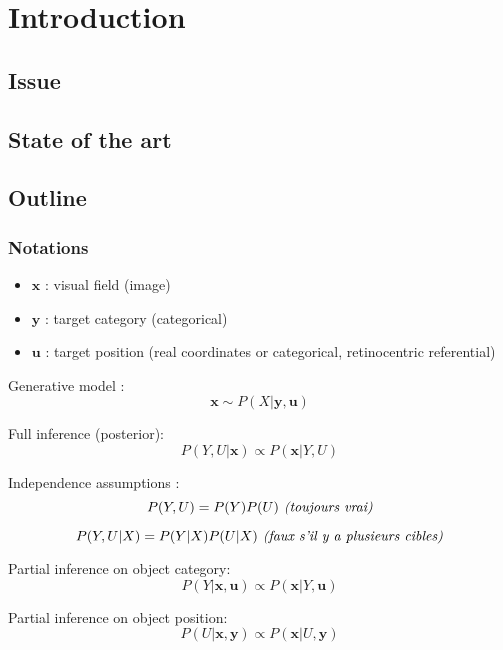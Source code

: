 \section{Introduction}

\subsection{Issue}

\subsection{State of the art}

\subsection{Outline}

\subsubsection{Notations}
\begin{itemize}
	\item $\boldsymbol{x}$ : visual field (image)
	\item $\boldsymbol{y}$ : target category (categorical)
	\item $\boldsymbol{u}$ : target position (real coordinates or categorical, retinocentric referential)

\end{itemize}

Generative model :
$$ \boldsymbol{x} \sim P(X|\boldsymbol{y}, \boldsymbol{u}) $$

Full inference (posterior):
$$ P(Y, U|\boldsymbol{x}) \propto  P(\boldsymbol{x}|Y, U) $$

Independence assumptions :
\begin{equation} 
P(Y, U) = P(Y)  P(U) \text{\emph{ (toujours vrai)}}
\label{eq:indep-1}
\end{equation}

\begin{equation}  
P(Y, U|X) = P(Y|X)  P(U|X) \text{\emph{ (faux s'il y a plusieurs cibles)}}
\label{eq:indep-2}
\end{equation}

Partial inference on object category:
$$ P(Y|\boldsymbol{x}, \boldsymbol{u}) \propto  P(\boldsymbol{x}|Y, \boldsymbol{u}) $$

Partial inference on object position:
$$ P(U|\boldsymbol{x}, \boldsymbol{y}) \propto  P(\boldsymbol{x}|U, \boldsymbol{y}) $$


